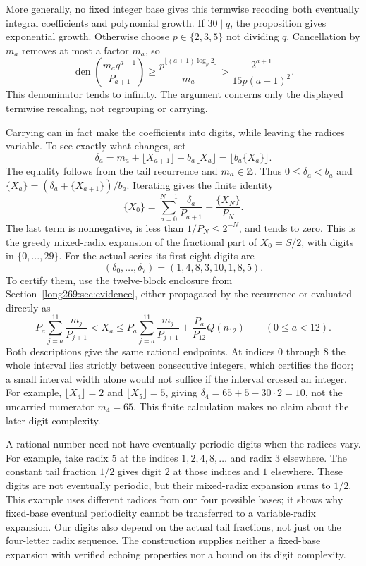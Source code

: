 \documentclass[11pt]{article}
\theoremstyle{remark}
\theoremstyle{plain}
\begin{document}
More generally, no fixed integer base gives this termwise recoding both
eventually integral coefficients and polynomial growth.  If $30\mid q$,
the proposition gives exponential growth.  Otherwise choose
$p\in\{2,3,5\}$ not dividing $q$.  Cancellation by $m_a$ removes at most
a factor $m_a$, so
\[
 \operatorname{den}\!\left(\frac{m_aq^{a+1}}{P_{a+1}}\right)
 \ge\frac{p^{\lfloor(a+1)\log_p2\rfloor}}{m_a}
 >\frac{2^{a+1}}{15p(a+1)^2}.
\]
This denominator tends to infinity.  The argument concerns only the
displayed termwise rescaling, not regrouping or carrying.

Carrying can in fact make the coefficients into digits, while leaving the
radices variable.  To see exactly what changes, set
\[
 \delta_a=m_a+\lfloor X_{a+1}\rfloor-b_a\lfloor X_a\rfloor
          =\lfloor b_a\{X_a\}\rfloor.
\]
The equality follows from the tail recurrence and $m_a\in\mathbb{Z}$.  Thus
$0\le\delta_a<b_a$ and $\{X_a\}=(\delta_a+\{X_{a+1}\})/b_a$.
Iterating gives the finite identity
\[
 \{X_0\}=\sum_{a=0}^{N-1}\frac{\delta_a}{P_{a+1}}
              +\frac{\{X_N\}}{P_N}.
\]
The last term is nonnegative, is less than $1/P_N\le2^{-N}$, and tends
to zero.  This is the greedy mixed-radix expansion of the fractional part
of $X_0=S/2$, with digits in $\{0,\ldots,29\}$.
For the actual series its first eight digits are
\[
 (\delta_0,\ldots,\delta_7)=(1,4,8,3,10,1,8,5).
\]
To certify them, use the twelve-block enclosure from
Section~\ref{long269:sec:evidence}, either propagated by the recurrence
or evaluated directly as
\[
 P_a\sum_{j=a}^{11}\frac{m_j}{P_{j+1}}<X_a
 \le P_a\sum_{j=a}^{11}\frac{m_j}{P_{j+1}}
       +\frac{P_a}{P_{12}}Q(n_{12})\qquad(0\le a<12).
\]
Both descriptions give the same rational endpoints.  At indices $0$
through $8$ the whole interval lies strictly between consecutive
integers, which certifies the floor; a small interval width alone would
not suffice if the interval crossed an integer.  For example,
$\lfloor X_4\rfloor=2$ and $\lfloor X_5\rfloor=5$, giving
$\delta_4=65+5-30\cdot2=10$, not the uncarried numerator $m_4=65$.
This finite calculation makes no claim about the later digit complexity.

A rational number need not have eventually periodic digits when the radices vary.  For example,
take radix $5$ at the indices $1,2,4,8,\ldots$ and radix $3$ elsewhere.
The constant tail fraction $1/2$ gives digit $2$ at those indices and
$1$ elsewhere.  These digits are not eventually periodic, but their
mixed-radix expansion sums to $1/2$.  This example uses different radices
from our four possible bases; it shows why fixed-base eventual
periodicity cannot be transferred to a variable-radix expansion.  Our digits also
depend on the actual tail fractions, not just on the four-letter radix
sequence.  The construction supplies neither a fixed-base expansion
with verified echoing properties nor a bound on its digit complexity.
\end{document}
